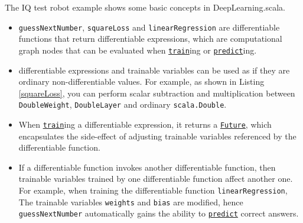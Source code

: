 The IQ test robot example shows some basic concepts in DeepLearning.scala.

\begin{itemize}
  \item \lstinline{guessNextNumber}, \lstinline{squareLoss} and \lstinline{linearRegression} are \glspl{differentiable function} that return \glspl{differentiable expression}, which are \gls{computational graph} nodes that can be evaluated when \href{https://javadoc.io/page/com.thoughtworks.deeplearning/deeplearning_2.11/latest/com/thoughtworks/deeplearning/DeepLearning.html#train(differentiable:Differentiable)(implicitmonoid:algebra.ring.MultiplicativeMonoid[DeepLearning.this.Delta]):com.thoughtworks.future.Future[DeepLearning.this.Data]}{\lstinline{train}}ing or \href{https://javadoc.io/page/com.thoughtworks.deeplearning/deeplearning_2.11/latest/com/thoughtworks/deeplearning/DeepLearning.html#predict(differentiable:Differentiable):com.thoughtworks.future.Future[DeepLearning.this.Data]}{\lstinline{predict}}ing.
  \item \Glspl{differentiable expression} and \glspl{trainable variable} can be used as if they are ordinary non-differentiable values. For example, as shown in Listing \ref{squareLoss}, you can perform scalar subtraction and multiplication between \lstinline{DoubleWeight}, \lstinline{DoubleLayer} and ordinary \lstinline{scala.Double}.
  \item When \href{https://javadoc.io/page/com.thoughtworks.deeplearning/deeplearning_2.11/latest/com/thoughtworks/deeplearning/DeepLearning.html#train(differentiable:Differentiable)(implicitmonoid:algebra.ring.MultiplicativeMonoid[DeepLearning.this.Delta]):com.thoughtworks.future.Future[DeepLearning.this.Data]}{\lstinline{train}}ing a \gls{differentiable expression}, it returns a \href{https://javadoc.io/page/com.thoughtworks.future/future_2.11/latest/com/thoughtworks/future%24%24Future.html}{\lstinline{Future}}, which encapsulates the side-effect of adjusting \glspl{trainable variable} referenced by the \gls{differentiable function}.
  \item If a \gls{differentiable function} invokes another \gls{differentiable function}, then \glspl{trainable variable} trained by one \gls{differentiable function} affect another one. For example, when training the \gls{differentiable function} \lstinline{linearRegression}, The \glspl{trainable variable} \lstinline{weights} and \lstinline{bias} are modified, hence \lstinline{guessNextNumber} automatically gains the ability to \href{https://javadoc.io/page/com.thoughtworks.deeplearning/deeplearning_2.11/latest/com/thoughtworks/deeplearning/DeepLearning.html#predict(differentiable:Differentiable):com.thoughtworks.future.Future[DeepLearning.this.Data]}{\lstinline{predict}} correct answers.
\end{itemize}

